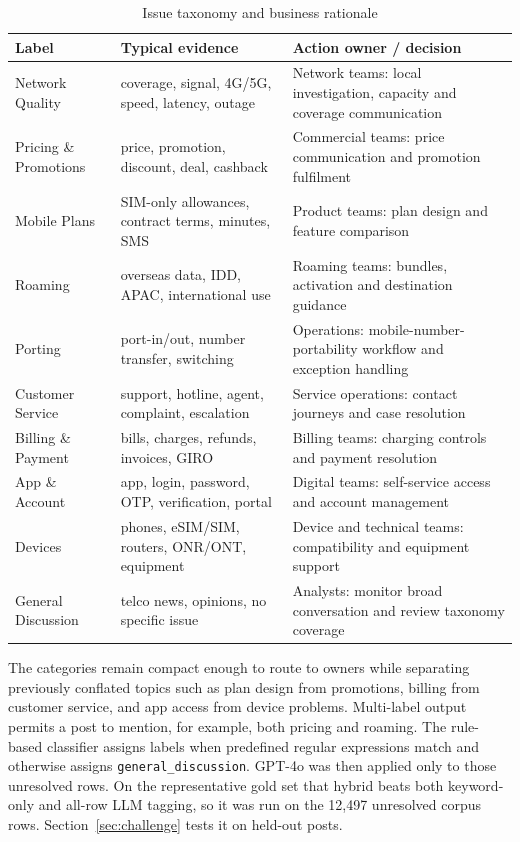 \documentclass[11pt,a4paper]{article}
\begin{document}
\begin{table}[H]
\centering
\caption{Issue taxonomy and business rationale}
\label{tab:taxonomy}
\begin{tabularx}{\textwidth}{@{}p{}p{}X@{}}
\toprule
\textbf{Label} & \textbf{Typical evidence} & \textbf{Action owner / decision} \\
\midrule
Network Quality & coverage, signal, 4G/5G, speed, latency, outage & Network teams: local investigation, capacity and coverage communication \\
Pricing \& Promotions & price, promotion, discount, deal, cashback & Commercial teams: price communication and promotion fulfilment \\
Mobile Plans & SIM-only allowances, contract terms, minutes, SMS & Product teams: plan design and feature comparison \\
Roaming & overseas data, IDD, APAC, international use & Roaming teams: bundles, activation and destination guidance \\
Porting & port-in/out, number transfer, switching & Operations: mobile-number-portability workflow and exception handling \\
Customer Service & support, hotline, agent, complaint, escalation & Service operations: contact journeys and case resolution \\
Billing \& Payment & bills, charges, refunds, invoices, GIRO & Billing teams: charging controls and payment resolution \\
App \& Account & app, login, password, OTP, verification, portal & Digital teams: self-service access and account management \\
Devices & phones, eSIM/SIM, routers, ONR/ONT, equipment & Device and technical teams: compatibility and equipment support \\
General Discussion & telco news, opinions, no specific issue & Analysts: monitor broad conversation and review taxonomy coverage \\
\bottomrule
\end{tabularx}
\end{table}

The categories remain compact enough to route to owners while separating previously conflated topics such as plan design from promotions, billing from customer service, and app access from device problems. Multi-label output permits a post to mention, for example, both pricing and roaming. The rule-based classifier assigns labels when predefined regular expressions match and otherwise assigns \texttt{general\_discussion}. GPT-4o was then applied only to those unresolved rows. On the representative gold set that hybrid beats both keyword-only and all-row LLM tagging, so it was run on the 12,497 unresolved corpus rows. Section~\ref{sec:challenge} tests it on held-out posts.
\end{document}
